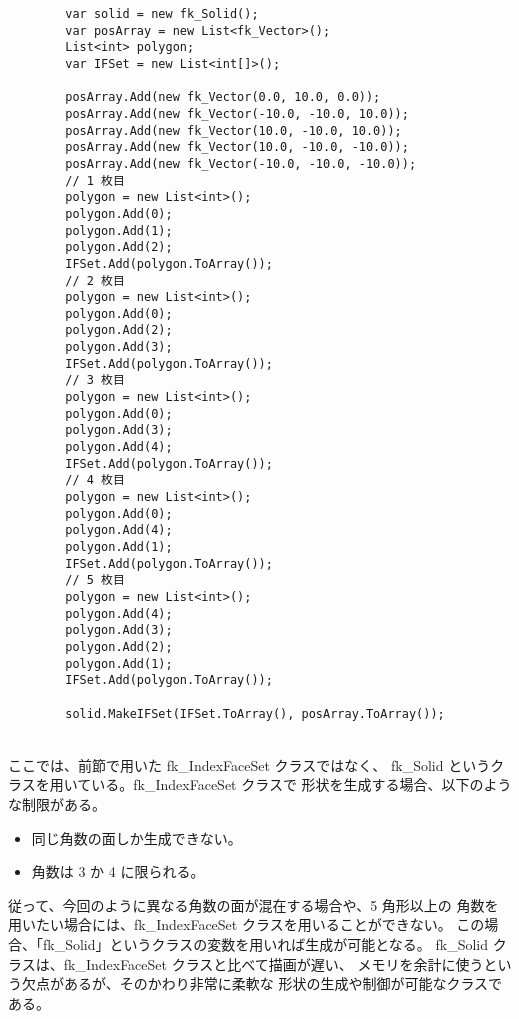 \begin{breakbox}
\begin{verbatim}
        var solid = new fk_Solid();
        var posArray = new List<fk_Vector>();
        List<int> polygon;
        var IFSet = new List<int[]>();

        posArray.Add(new fk_Vector(0.0, 10.0, 0.0));
        posArray.Add(new fk_Vector(-10.0, -10.0, 10.0));
        posArray.Add(new fk_Vector(10.0, -10.0, 10.0));
        posArray.Add(new fk_Vector(10.0, -10.0, -10.0));
        posArray.Add(new fk_Vector(-10.0, -10.0, -10.0));
        // 1 枚目
        polygon = new List<int>();
        polygon.Add(0);
        polygon.Add(1);
        polygon.Add(2);
        IFSet.Add(polygon.ToArray());
        // 2 枚目
        polygon = new List<int>();
        polygon.Add(0);
        polygon.Add(2);
        polygon.Add(3);
        IFSet.Add(polygon.ToArray());
        // 3 枚目
        polygon = new List<int>();
        polygon.Add(0);
        polygon.Add(3);
        polygon.Add(4);
        IFSet.Add(polygon.ToArray());
        // 4 枚目
        polygon = new List<int>();
        polygon.Add(0);
        polygon.Add(4);
        polygon.Add(1);
        IFSet.Add(polygon.ToArray());
        // 5 枚目
        polygon = new List<int>();
        polygon.Add(4);
        polygon.Add(3);
        polygon.Add(2);
        polygon.Add(1);
        IFSet.Add(polygon.ToArray());

        solid.MakeIFSet(IFSet.ToArray(), posArray.ToArray());
\end{verbatim}
\end{breakbox}
~ \\
ここでは、前節で用いた fk\_IndexFaceSet クラスではなく、
fk\_Solid というクラスを用いている。fk\_IndexFaceSet クラスで
形状を生成する場合、以下のような制限がある。
\begin{itemize}
 \item 同じ角数の面しか生成できない。
 \item 角数は 3 か 4 に限られる。
\end{itemize}
従って、今回のように異なる角数の面が混在する場合や、5 角形以上の
角数を用いたい場合には、fk\_IndexFaceSet クラスを用いることができない。
この場合、「fk\_Solid」というクラスの変数を用いれば生成が可能となる。
fk\_Solid クラスは、fk\_IndexFaceSet クラスと比べて描画が遅い、
メモリを余計に使うという欠点があるが、そのかわり非常に柔軟な
形状の生成や制御が可能なクラスである。

